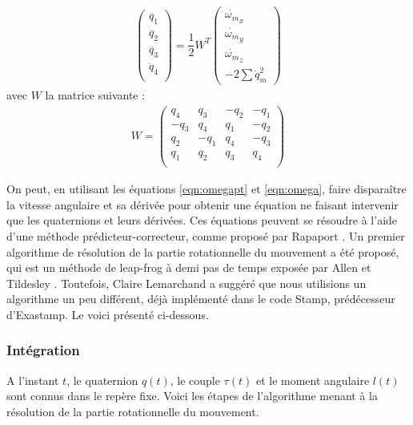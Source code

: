 \documentclass[12pt]{article}
\begin{document}
\begin{eqnarray} \label{eqn:qptpt}
\begin{pmatrix}
\ddot{q_1} \\ \ddot{q_2} \\ \ddot{q_3} \\ \ddot{q}_4 \\
\end{pmatrix}
= \dfrac{1}{2} W^T \begin{pmatrix}
\dot{\omega_m}_x \\ \dot{\omega_m}_y \\ \dot{\omega_m}_z \\ -2\sum \dot{q}_m^2
\end{pmatrix}
\end{eqnarray}
avec $W$ la matrice suivante :
\begin{eqnarray}
W=\begin{pmatrix}
q_4 & q_3 & -q_2 & -q_1 \\
-q_3 & q_4 & q_1 & -q_2 \\
q_2 & -q_1 & q_4 & -q_3 \\
q_1 & q_2 & q_3 & q_4 \\
\end{pmatrix}
\end{eqnarray}

On peut, en utilisant les équations \ref{eqn:omegapt} et \ref{eqn:omega}, faire disparaître la vitesse angulaire et sa dérivée pour obtenir une équation ne faisant intervenir que les quaternions et leurs dérivées. Ces équations peuvent se résoudre à l'aide d'une méthode prédicteur-correcteur, comme proposé par Rapaport \cite{rapaport}. Un premier algorithme de résolution de la partie rotationnelle du mouvement a été proposé, qui est un méthode de leap-frog à demi pas de temps exposée par Allen et Tildesley \cite{allentildesley}. Toutefois, Claire Lemarchand a suggéré que nous utilisions un algorithme un peu différent, déjà implémenté dans le code Stamp, prédécesseur d'Exastamp. Le voici présenté ci-dessous. \\

\subsubsection{Intégration}

A l'instant $t$, le quaternion $q\left(t\right)$, le couple $\tau\left(t\right)$ et le moment angulaire $l\left(t\right)$ sont connus dans le repère fixe. Voici les étapes de l'algorithme menant à la résolution de la partie rotationnelle du mouvement.
\end{document}
